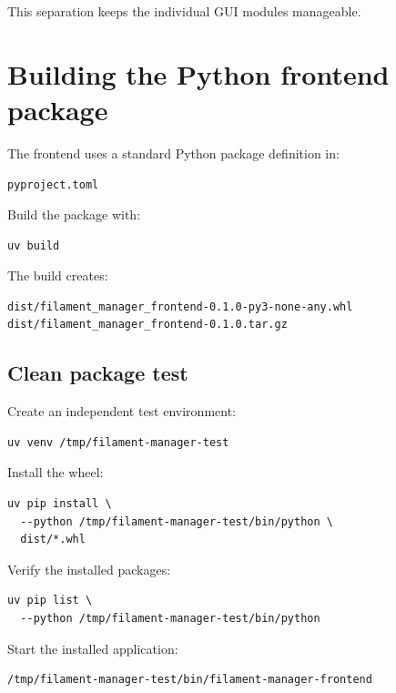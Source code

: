 \documentclass[a4paper,11pt]{article}
\begin{document}
This separation keeps the individual GUI modules manageable.

\section{Building the Python frontend package}

The frontend uses a standard Python package definition in:

\begin{lstlisting}
pyproject.toml
\end{lstlisting}

Build the package with:

\begin{lstlisting}
uv build
\end{lstlisting}

The build creates:

\begin{lstlisting}
dist/filament_manager_frontend-0.1.0-py3-none-any.whl
dist/filament_manager_frontend-0.1.0.tar.gz
\end{lstlisting}

\subsection{Clean package test}

Create an independent test environment:

\begin{lstlisting}
uv venv /tmp/filament-manager-test
\end{lstlisting}

Install the wheel:

\begin{lstlisting}
uv pip install \
  --python /tmp/filament-manager-test/bin/python \
  dist/*.whl
\end{lstlisting}

Verify the installed packages:

\begin{lstlisting}
uv pip list \
  --python /tmp/filament-manager-test/bin/python
\end{lstlisting}

Start the installed application:

\begin{lstlisting}
/tmp/filament-manager-test/bin/filament-manager-frontend
\end{lstlisting}
\end{document}
